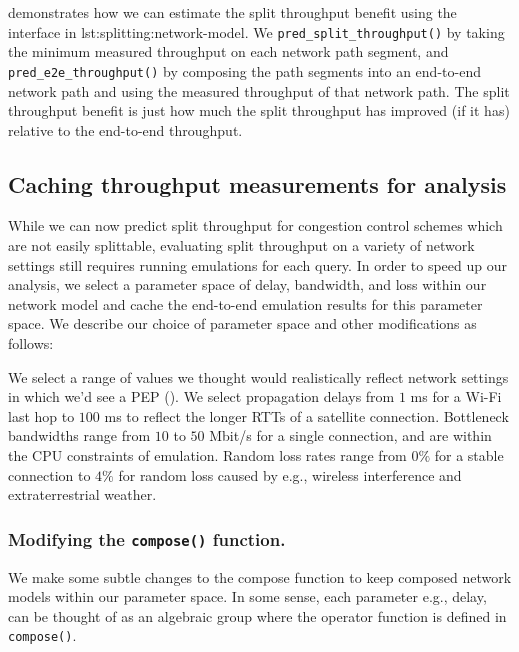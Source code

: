  demonstrates how we can estimate the split
throughput benefit using the interface in \Cref
{lst:splitting:network-model}. We \texttt{pred\_split\_throughput()} by taking
the minimum measured throughput on each network path segment, and \texttt
{pred\_e2e\_throughput()} by composing the path segments into an end-to-end
network path and using the measured throughput of that network path. The split
throughput benefit is just how much the split throughput has improved (if it has)
relative to the end-to-end throughput.

\subsection{Caching throughput measurements for analysis}
\label{sec:splitting:heuristic:caching}

While we can now predict split throughput for congestion control schemes which
are not easily
splittable, evaluating split throughput on a variety of network settings still
requires running emulations for each query. In order to speed up our analysis,
we select a parameter space of delay, bandwidth, and loss within our network
model and cache the end-to-end emulation results for this parameter space. We
describe our choice of parameter space and other modifications as follows:



We select a range of values we thought would realistically reflect network
settings in which we'd see a PEP (). We select propagation
delays from $1$ ms for a Wi-Fi last hop to $100$ ms to reflect the longer RTTs
of a satellite connection. Bottleneck bandwidths range from $10$ to $50$ Mbit/s
for a single connection, and are within the CPU constraints of emulation. Random
loss rates range from $0\%$ for a stable connection to $4\%$ for random loss
caused by e.g., wireless interference and extraterrestrial weather.

\subsubsection{Modifying the \texttt{compose()} function.}
We make some subtle changes to the compose function to keep composed network
models within our parameter space.
In some sense, each parameter e.g., delay, can be thought of as an algebraic
group where the operator function is defined in \texttt{compose()}.

